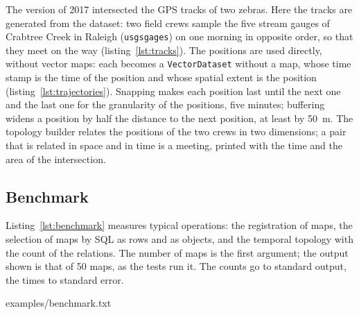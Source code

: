 \documentclass[10pt,a4paper]{article}
\makeatletter
\newcommand{\code}[1]{\texttt{#1}}
\newcommand{\attachmentdate}{D:20261106000000Z}
\DeclareRobustCommand{\examplefile}[1]{%
  \code{python/grass/docs/src/temporal\_framework\_design/examples/%
    \detokenize{#1}}\\
  attached to this PDF as \code{\detokenize{#1}}%
  \embedfileifobjectexists{\detokenize{#1}}{Filespec}{}{%
    \begingroup
    \def\pdf@filemoddate##1{\attachmentdate}%
    \embedfile[id=\detokenize{#1},filespec=\detokenize{#1},
      mimetype=text/x-python]{examples/\detokenize{#1}}%
    \endgroup}}
\makeatother
\begin{document}
The version of 2017 intersected the GPS tracks of two zebras. Here the tracks
are generated from the dataset: two field crews sample the five stream gauges
of Crabtree Creek in Raleigh (\code{usgsgages}) on one morning in opposite
order, so that they meet on the way (listing~\ref{lst:tracks}). The positions
are used directly, without vector maps: each becomes a \code{VectorDataset}
without a map, whose time stamp is the time of the position and whose spatial
extent is the position (listing~\ref{lst:trajectories}). Snapping makes each
position last until the next one and the last one for the granularity of the
positions, five minutes; buffering widens a position by half the distance to
the next position, at least by 50~m. The topology builder relates the
positions of the two crews in two dimensions; a pair that is related in space
and in time is a meeting, printed with the time and the area of the
intersection.









\subsection{Benchmark}

Listing~\ref{lst:benchmark} measures typical operations: the registration of
maps, the selection of maps by SQL as rows and as objects, and the temporal
topology with the count of the relations. The number of maps is the first
argument; the output shown is that of 50 maps, as the tests run it. The
counts go to standard output, the times to standard error.



%
{examples/benchmark.txt}
\end{document}
